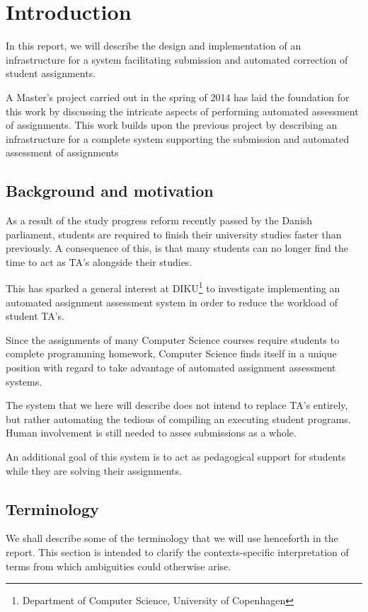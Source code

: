 \chapter{Introduction}
In this report, we will describe the design and implementation of an
infrastructure for a system facilitating submission and automated
correction of student assignments.

A Master's project carried out in the spring of 2014 has laid the
foundation for this work by discussing the intricate aspects of
performing automated assessment of assignments\cite{onlineta}. This
work builds upon the previous project by describing an infrastructure
for a complete system supporting the submission and automated
assessment of assignments 

\section{Background and motivation}
As a result of the study progress reform recently passed by the Danish
parliament, students are required to finish their university studies
faster than previously. A consequence of this, is that many students
can no longer find the time to act as TA's alongside their studies.

This has sparked a general interest at DIKU\footnote{Department of
  Computer Science, University of Copenhagen} to investigate
implementing an automated assignment assessment system in order to
reduce the workload of student TA's.

Since the assignments of many Computer Science courses require
students to complete programming homework, Computer Science finds
itself in a unique position with regard to take advantage of automated assignment
assessment systems.

The system that we here will describe does not intend to replace TA's
entirely, but rather automating the tedious of compiling an executing
student programs. Human involvement is still needed to asses
submissions as a whole.

An additional goal of this system is to act as pedagogical support for
students while they are solving their assignments. 

\section{Terminology}
We shall describe some of the terminology that we will use henceforth
in the report. This section is intended to clarify the
contexts-specific interpretation of terms from which ambiguities could
otherwise arise. 

